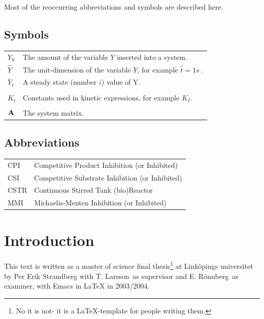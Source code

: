 \documentclass[a4paper, 10pt, twoside, openright]{book}
\newcommand{\putexaminer}[0]{E. Rönnberg}
\newcommand{\putsupervisor}[0]{T. Larsson}
\begin{document}
Most of the reoccurring abbreviations and symbols are described here.


\section*{Symbols}

\begin{tabular}{ll}
$Y_0$      & The amount of the variable $Y$ inserted into a system.\\
$\hat Y$& The unit-dimension of the variable $Y$, for example $\hat t=1s$ .\\
$\bar Y_i$ & A steady state (number $i$) value of Y.\\
\phantom{a}& \phantom{b} \\
$K_i$ & Constants used in kinetic expressions, for example $K_I$.\\
\phantom{a}& \phantom{b} \\
$\mathbf{A}$     & The system matrix. \\
\end{tabular}

\section*{Abbreviations}

\begin{tabular}{ll}
CPI      & Competitive Product Inhibition (or Inhibited)\index{CPI}\\
CSI      & Competitive Substrate Inhibition (or Inhibited)\index{CSI}\\
CSTR     & Continuous Stirred Tank (bio)Reactor\index{CSTR}\\
MMI      & Michaelis-Menten Inhibition (or Inhibited)\index{MMI}
\end{tabular}


\tableofcontents 

\mainmatter


\chapter{Introduction}

\iffalse

\textsf{%
This text is written as a master of science final
thesis\footnote{No it is not- it is a LaTeX-template for people
  writing them.}
at Linköpings universitet
by Per Erik Strandberg
with \putsupervisor~as supervisor and \putexaminer~as examiner,
with Emacs in \LaTeX{}
in 2003/2004.}
\end{document}
